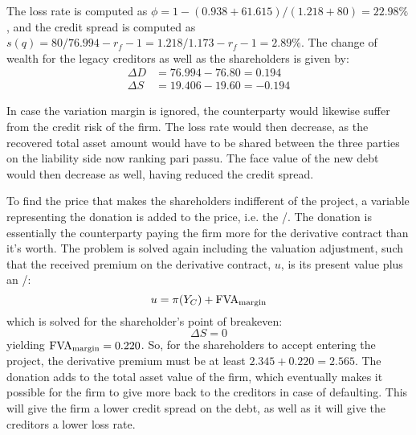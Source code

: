 \documentclass[../main.tex]{subfiles}
\begin{document}
        The loss rate is computed as
        $\phi = 1-(0.938+61.615)/(1.218+80) = 22.98\%$,
        and the credit spread is computed as
        $s(q) = 80/76.994 - r_f - 1 = 1.218/1.173 - r_f - 1 = 2.89\%$. The change of wealth for the legacy creditors as well as the shareholders is given by:
        \begin{align}
            \Delta D &= 76.994 - 76.80 = 0.194\\
            \Delta S &= 19.406 - 19.60 = -0.194
        \end{align}

        In case the variation margin is ignored, the counterparty would likewise suffer from the credit risk of the firm.
        The loss rate would then decrease,
        as the recovered total asset amount would have to be shared between the three parties on the liability side now ranking pari passu. The face value of the new debt would then decrease as well, having reduced the credit spread.

        To find the price that makes the shareholders indifferent of the project,
        a variable representing the donation is added to the price, i.e. the \MVA/.
        The donation is essentially the counterparty paying the firm more for the derivative contract than it's worth.
        The problem is solved again including the valuation adjustment,
        such that the received premium on the derivative contract, $u$, is its present value plus an \MVA/:
        \begin{equation}
            u = \pi(Y_C) + \MVA/
        \end{equation}
        which is solved for the shareholder's point of breakeven:
        \begin{equation}
            \Delta S = 0
        \end{equation}
        yielding $\MVA/ = 0.220$. So, for the shareholders to accept entering the project, the derivative premium must be at least $2.345 + 0.220 = 2.565$.
        The donation adds to the total asset value of the firm,
        which eventually makes it possible for the firm to give more back to the creditors in case of defaulting.
        This will give the firm a lower credit spread on the debt, as well as it will give the creditors a lower loss rate.
        
\end{document}
